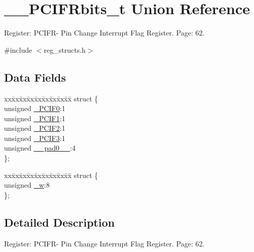 \hypertarget{union_____p_c_i_f_rbits__t}{\section{\+\_\+\+\_\+\+P\+C\+I\+F\+Rbits\+\_\+t Union Reference}
\label{union_____p_c_i_f_rbits__t}
}


Register\+: P\+C\+I\+F\+R-\/ Pin Change Interrupt Flag Register. Page\+: 62.  




{\ttfamily \#include $<$reg\+\_\+structs.\+h$>$}

\subsection*{Data Fields}
\begin{DoxyCompactItemize}
\item 
\begin{tabbing}
xx\=xx\=xx\=xx\=xx\=xx\=xx\=xx\=xx\=\kill
struct \{\\
\>unsigned \hyperlink{union_____p_c_i_f_rbits__t_a0782c74fd65113393df42a21af950b66}{\_PCIF0}:1\\
\>unsigned \hyperlink{union_____p_c_i_f_rbits__t_ac659378a43767f64110245c2547fa45b}{\_PCIF1}:1\\
\>unsigned \hyperlink{union_____p_c_i_f_rbits__t_a111baf04c2d4110cb5ca2da302bf069d}{\_PCIF2}:1\\
\>unsigned \hyperlink{union_____p_c_i_f_rbits__t_a84fa3f46398331838d5541d1ef7daa3d}{\_PCIF3}:1\\
\>unsigned \hyperlink{union_____p_c_i_f_rbits__t_a78240d012f7f1cbb62559feffc6dc21a}{\_\_pad0\_\_}:4\\
\}; \\

\end{tabbing}\item 
\begin{tabbing}
xx\=xx\=xx\=xx\=xx\=xx\=xx\=xx\=xx\=\kill
struct \{\\
\>unsigned \hyperlink{union_____p_c_i_f_rbits__t_adf9a3268ff2b4be98dd16f9685f6e7bf}{\_w}:8\\
\}; \\

\end{tabbing}\end{DoxyCompactItemize}


\subsection{Detailed Description}
Register\+: P\+C\+I\+F\+R-\/ Pin Change Interrupt Flag Register. Page\+: 62. 

